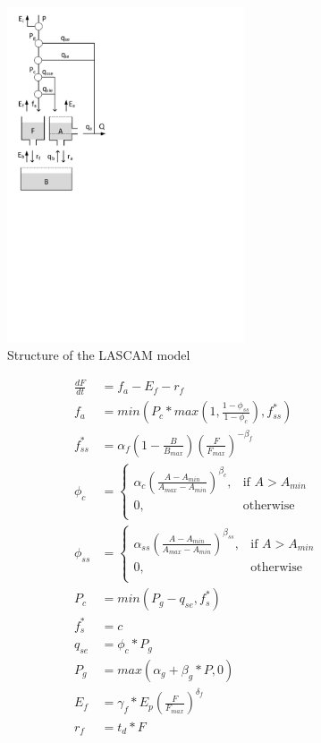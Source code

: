 { 																	%
\begin{figure}
\includegraphics[trim=1cm 13.5cm 7cm 1cm,width=7cm,keepaspectratio]{./files/23_schematic.pdf}
\caption{Structure of the LASCAM model} \label{fig:23_schematic}
\end{figure}

\begin{align}
	\frac{dF}{dt} &= f_a-E_f-r_f \\
	f_a &= min\left(P_c*max\left(1,\frac{1-\phi_{ss}}{1-\phi_c}\right),f_{ss}^*\right) \\
	f_{ss}^* &= \alpha_f\left(1-\frac{B}{B_{max}}\right)\left(\frac{F}{F_{max}}\right)^{-\beta_f}\\
	\phi_c &= \begin{cases}
		\alpha_c\left(\frac{A-A_{min}}{A_{max}-A_{min}}\right)^{\beta_c}, &\text{if } A > A_{min} \\
		0, & \text{otherwise} \\
	\end{cases}\\
	\phi_{ss} &= \begin{cases}
		\alpha_{ss}\left(\frac{A-A_{min}}{A_{max}-A_{min}}\right)^{\beta_{ss}}, &\text{if } A > A_{min} \\
		0, & \text{otherwise} \\
	\end{cases}\\
	P_c &= min\left(P_g-q_{se},f^*_s\right) \\
	f^*_s &= c \\
	q_{se} &= \phi_c*P_g \\
	P_g &= max\left(\alpha_g+\beta_g*P,0\right)\\
	E_f &= \gamma_f*E_p\left(\frac{F}{F_{max}}\right)^{\delta_f}\\
	r_f &= t_d*F
\end{align}

} %

